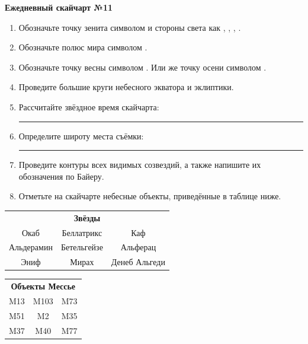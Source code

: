 \documentclass{./SAS-class-skygen}
\begin{document}
    
    
    
	\begin{center}
		\large\textbf{Ежедневный скайчарт №11}
	\end{center}

	\begin{enumerate}
		\item Обозначьте точку зенита символом  и стороны света как , , , .
		\item Обозначьте полюс мира символом .
		\item Обозначьте точку весны символом \Aries. Или же точку осени символом \Libra.
		\item Проведите большие круги небесного экватора и эклиптики.
		\item Рассчитайте звёздное время скайчарта: \rule{2cm}{0.4pt}
		\item Определите широту места съёмки: \rule{2cm}{0.4pt}
		\item Проведите контуры всех видимых созвездий, а также напишите их обозначения по Байеру.
		\item Отметьте на скайчарте небесные объекты, приведённые в таблице ниже.
	\end{enumerate}
	
    \vspace{0.5cm}

    \begin{table}[h!]
    \centering
    \begin{tabular}{ccc}
    \multicolumn{3}{c}{\textbf{Звёзды}} \\ Окаб & Беллатрикс & Каф \\
Альдерамин & Бетельгейзе & Альферац \\
Эниф & Мирах & Денеб Альгеди \\

\end{tabular}
    \hfill
    \begin{tabular}{ccc}
    \multicolumn{3}{c}{\textbf{Объекты Мессье}} \\ M13 & M103 & M73 \\
M51 & M2 & M35 \\
M37 & M40 & M77 \\

\end{tabular}
    \end{table}
	
\end{document}
